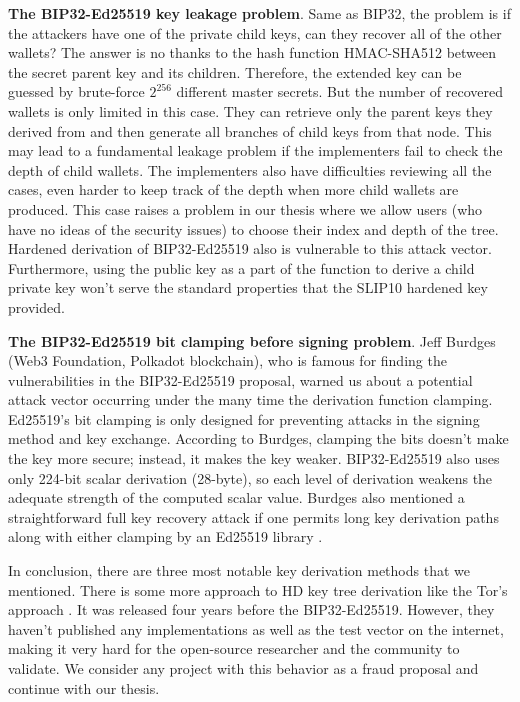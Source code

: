 \bigskip
{\textbf{The BIP32-Ed25519 key leakage problem}}. Same as BIP32, the problem is if the attackers have one of the private child keys, can they recover all of the other wallets? The answer is no thanks to the hash function HMAC-SHA512 between the secret parent key and its children. Therefore, the extended key can be guessed by brute-force $2^{256}$ different master secrets. But the number of recovered wallets is only limited in this case. They can retrieve only the parent keys they derived from and then generate all branches of child keys from that node. This may lead to a fundamental leakage problem if the implementers fail to check the depth of child wallets. The implementers also have difficulties reviewing all the cases, even harder to keep track of the depth when more child wallets are produced. This case raises a problem in our thesis where we allow users (who have no ideas of the security issues) to choose their index and depth of the tree. Hardened derivation of BIP32-Ed25519 also is vulnerable to this attack vector. Furthermore, using the public key as a part of the function to derive a child private key won’t serve the standard properties that the SLIP10 hardened key provided.

\bigskip
{\textbf{The BIP32-Ed25519 bit clamping before signing problem}}. Jeff Burdges (Web3 Foundation, Polkadot blockchain), who is famous for finding the vulnerabilities in the BIP32-Ed25519 proposal, warned us about a potential attack vector occurring under the many time the derivation function clamping. Ed25519’s bit clamping is only designed for preventing attacks in the signing method and key exchange. According to Burdges, clamping the bits doesn’t make the key more secure; instead, it makes the key weaker. BIP32-Ed25519 also uses only 224-bit scalar derivation (28-byte), so each level of derivation weakens the adequate strength of the computed scalar value.
Burdges also mentioned a straightforward full key recovery attack if one permits long key derivation paths along with either clamping by an Ed25519 library \cite{Jeff}.

In conclusion, there are three most notable key derivation methods that we mentioned. There is some more approach to HD key tree derivation like the Tor’s approach \cite{torspec}. It was released four years before the BIP32-Ed25519. However, they haven’t published any implementations as well as the test vector on the internet, making it very hard for the open-source researcher and the community to validate. We consider any project with this behavior as a fraud proposal and continue with our thesis.

